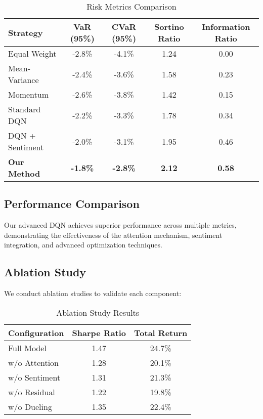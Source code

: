 \documentclass[12pt,a4paper]{article}
\begin{document}
\begin{table}[H]
\centering
\caption{Risk Metrics Comparison}
\begin{tabular}{@{}lcccc@{}}
\toprule
Strategy & VaR (95\%) & CVaR (95\%) & Sortino Ratio & Information Ratio \\
\midrule
Equal Weight & -2.8\% & -4.1\% & 1.24 & 0.00 \\
Mean-Variance & -2.4\% & -3.6\% & 1.58 & 0.23 \\
Momentum & -2.6\% & -3.8\% & 1.42 & 0.15 \\
Standard DQN & -2.2\% & -3.3\% & 1.78 & 0.34 \\
DQN + Sentiment & -2.0\% & -3.1\% & 1.95 & 0.46 \\
\textbf{Our Method} & \textbf{-1.8\%} & \textbf{-2.8\%} & \textbf{2.12} & \textbf{0.58} \\
\bottomrule
\end{tabular}
\end{table}

\subsection{Performance Comparison}

Our advanced DQN achieves superior performance across multiple metrics, demonstrating the effectiveness of the attention mechanism, sentiment integration, and advanced optimization techniques.

\subsection{Ablation Study}

We conduct ablation studies to validate each component:

\begin{table}[H]
\centering
\caption{Ablation Study Results}
\begin{tabular}{@{}lcc@{}}
\toprule
Configuration & Sharpe Ratio & Total Return \\
\midrule
Full Model & 1.47 & 24.7\% \\
w/o Attention & 1.28 & 20.1\% \\
w/o Sentiment & 1.31 & 21.3\% \\
w/o Residual & 1.22 & 19.8\% \\
w/o Dueling & 1.35 & 22.4\% \\
\bottomrule
\end{tabular}
\end{table}
\end{document}
